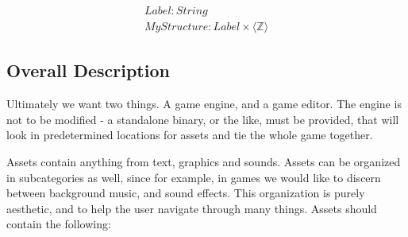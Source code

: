 \begin{equation}
\label{eq:as:e2}
\begin{split}
Label\colon String \\
MyStructure\colon Label \times \langle \mathbb{Z} \rangle
\end{split}
\end{equation}

\subsection{Overall Description}

Ultimately we want two things. A game engine, and a game editor. The engine is
not to be modified - a standalone binary, or the like, must be provided, that
will look in predetermined locations for assets and tie the whole game
together.

Assets contain anything from text, graphics and sounds. Assets can be organized
in subcategories as well, since for example, in games we would like to discern
between background music, and sound effects. This organization is purely
aesthetic, and to help the user navigate through many things. Assets should
contain the following:

